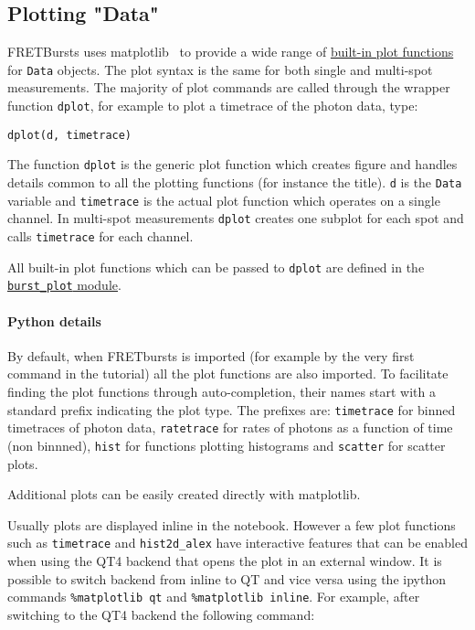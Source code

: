 \subsection{Plotting "Data"}

FRETBursts uses matplotlib~\cite{2096e2a4-8f50-4519-bfb3-f796da201630} to
provide a wide range of 
\href{http://fretbursts.readthedocs.org/en/latest/plots.html}{built-in plot functions}
for \verb|Data| objects. 
The plot syntax is the same for both single and multi-spot measurements. 
The majority of plot commands are called through the wrapper function 
\verb|dplot|, for example to plot a timetrace of the photon data, type:

\begin{verbatim}
dplot(d, timetrace)
\end{verbatim}

The function \verb|dplot| is the generic plot function which creates figure
and handles details common to all the plotting functions (for instance the title).
\verb|d| is the \verb|Data| variable and \verb|timetrace| is the actual plot
function which operates on a single channel. In multi-spot measurements
\verb|dplot| creates one subplot for each spot and calls \verb|timetrace| for
each channel.

All built-in plot functions which can be passed to 
\verb|dplot| are defined in the 
\href{http://fretbursts.readthedocs.org/en/latest/plots.html}{\texttt{burst\_plot} module}. 

\paragraph{Python details}

By default, when FRETbursts is imported (for example by the very first command 
in the tutorial) all the plot functions are also imported. 
To facilitate finding the plot functions through auto-completion, 
their names start with a standard prefix indicating the
plot type. The prefixes are: \verb|timetrace| for binned timetraces
of photon data, \verb|ratetrace| for rates of photons as a function of time (non
binnned), \verb|hist| for functions plotting histograms and \verb|scatter| for
scatter plots.

Additional plots can be easily created directly with matplotlib.

Usually plots are displayed inline in the notebook. However a few plot functions
 such as \verb|timetrace| and \verb|hist2d_alex| have interactive features that
can be enabled when using the QT4 backend that opens the plot in an external
window. It is possible to switch backend from inline to QT and vice versa using
the ipython commands \verb|%matplotlib qt|
and \verb|%matplotlib inline|. For example, after switching to the QT4 backend
the following command:

